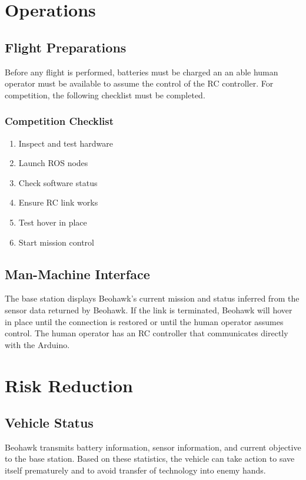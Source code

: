 \documentclass[12pt, letterpaper]{article}
\begin{document}
\section{Operations}

\subsection{Flight Preparations}
Before any flight is performed, batteries must be charged an an able human operator must be available to assume the control of the RC controller.  For competition, the following checklist must be completed.

\subsubsection{Competition Checklist}
\begin{enumerate}
  \item Inspect and test hardware
  \item Launch ROS nodes
  \item Check software status
  \item Ensure RC link works
  \item Test hover in place
  \item Start mission control
\end{enumerate}

\subsection{Man-Machine Interface}
The base station displays Beohawk's current mission and status inferred from the sensor data returned by Beohawk.  If the link is terminated, Beohawk will  hover in place until the connection is restored or until the human operator assumes control. The human operator has an RC controller that communicates directly with the Arduino.


\section{Risk Reduction}
\subsection{Vehicle Status}
Beohawk transmits battery information, sensor information, and current objective to the base station. Based on these statistics, the vehicle can take action to save itself prematurely and to avoid transfer of technology into enemy hands. 
\end{document}
